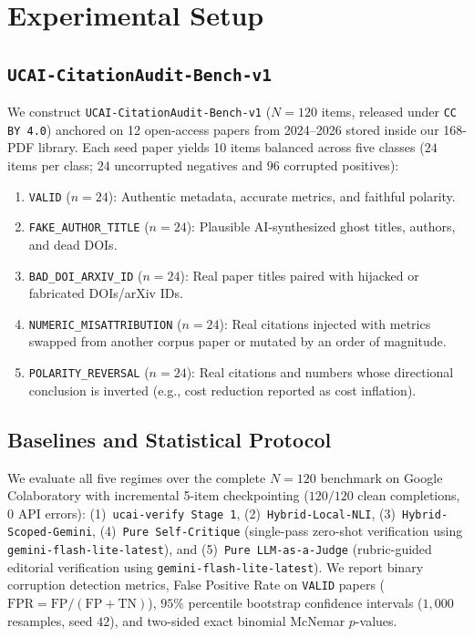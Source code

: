 \documentclass[10pt,twocolumn]{article}
\begin{document}
\section{Experimental Setup}
\subsection{\texttt{UCAI-CitationAudit-Bench-v1}}
We construct \texttt{UCAI-CitationAudit-Bench-v1} ($N = 120$ items, released under \texttt{CC BY 4.0}) anchored on 12 open-access papers from 2024--2026 \cite{lu2024aiscientist,gottweis2025coscientist,skarlinski2024paperqa2,chen2025scienceagentbench,li2025autosdt,chen2025mlrbench,zhao2026hallucinations,russinovich2026phantom,fischer2026muninai,li2026llmreviewer,loc2026prism,mitchener2025kosmos} stored inside our 168-PDF library. Each seed paper yields 10 items balanced across five classes ($24$ items per class; $24$ uncorrupted negatives and $96$ corrupted positives):
\begin{enumerate}
  \item \texttt{VALID} ($n=24$): Authentic metadata, accurate metrics, and faithful polarity.
  \item \texttt{FAKE\_AUTHOR\_TITLE} ($n=24$): Plausible AI-synthesized ghost titles, authors, and dead DOIs.
  \item \texttt{BAD\_DOI\_ARXIV\_ID} ($n=24$): Real paper titles paired with hijacked or fabricated DOIs/arXiv IDs.
  \item \texttt{NUMERIC\_MISATTRIBUTION} ($n=24$): Real citations injected with metrics swapped from another corpus paper or mutated by an order of magnitude.
  \item \texttt{POLARITY\_REVERSAL} ($n=24$): Real citations and numbers whose directional conclusion is inverted (e.g., cost reduction reported as cost inflation).
\end{enumerate}

\subsection{Baselines and Statistical Protocol}
We evaluate all five regimes over the complete $N=120$ benchmark on Google Colaboratory with incremental 5-item checkpointing ($120/120$ clean completions, $0$ API errors): (1)~\texttt{ucai-verify Stage 1}, (2)~\texttt{Hybrid-Local-NLI}, (3)~\texttt{Hybrid-Scoped-Gemini}, (4)~\texttt{Pure Self-Critique} (single-pass zero-shot verification using \texttt{gemini-flash-lite-latest}), and (5)~\texttt{Pure LLM-as-a-Judge} (rubric-guided editorial verification using \texttt{gemini-flash-lite-latest}). We report binary corruption detection metrics, False Positive Rate on \texttt{VALID} papers ($\mathrm{FPR} = \mathrm{FP}/(\mathrm{FP}+\mathrm{TN})$), $95\%$ percentile bootstrap confidence intervals ($1{,}000$ resamples, seed $42$), and two-sided exact binomial McNemar $p$-values.
\end{document}
